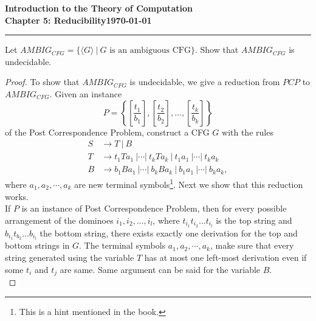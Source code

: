 \documentclass[11pt]{article}
\newcommand{\dated}{\today}
\begin{document}
\textbf{Introduction to the Theory of
Computation}\hfill\textbf{\myname}\\[0.01in]
\textbf{Chapter 5: Reducibility}\hfill\textbf{\dated}\\
\smallskip\hrule\bigskip

\begin{problem}{5.21}
Let $AMBIG_{CFG} = \{\langle G \rangle \ | \ G \text{ is an ambiguous CFG}\}$. Show that $AMBIG_{CFG}$ is undecidable.
\end{problem}

\begin{proof}
To show that $AMBIG_{CFG}$ is undecidable, we give a reduction from $PCP$ to $AMBIG_{CFG}$. Given an instance
\[
P=\left\{\left[\frac{t_{1}}{b_{1}}\right] ,\left[\frac{t_{2}}{b_{2}}\right] ,\dotsc ,\left[\frac{t_{k}}{b_{k}}\right]\right\}
\]
of the Post Correspondence Problem, construct a CFG $G$ with the rules
\begin{align*}
S &\rightarrow T \ | \ B \\
T &\rightarrow t_1Ta_1 \ | \cdots |  \ t_kTa_k \ | \ t_1a_1 \ | \cdots | \ t_ka_k \\
B &\rightarrow b_1Ba_1 \ | \cdots |  \ b_kBa_k \ | \ b_1a_1 \ | \cdots | \ b_ka_k,
\end{align*}
where $a_1,a_2,\cdots,a_k$ are new terminal symbols\footnote{This is a hint mentioned in the book.}. Next we show that this reduction works. \\

If $P$ is an instance of Post Correspondence Problem, then for every possible arrangement of the dominoes $i_1, i_2,\dots,i_l$, where $t_{i_{1}}t_{i_{2}} \dots t_{i_{l}}$ is the top string and $b_{i_{1}}t_{b_{2}} \dots b_{i_{l}}$ the bottom string, there exists exactly one derivation for the top and bottom strings in $G$. The terminal symbols $a_1,a_2,\cdots,a_k$, make sure that every string generated using the variable $T$ has at most one left-most derivation even if some $t_{i}$ and $t_{j}$ are same. Same argument can be said for the variable $B$. \\


\end{proof}
\end{document}
